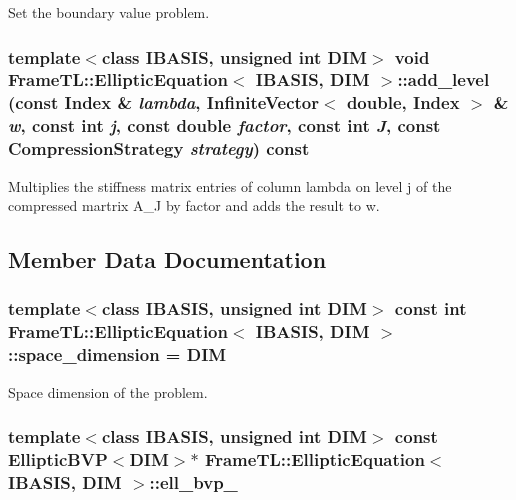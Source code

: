 Set the boundary value problem. \hypertarget{classFrameTL_1_1EllipticEquation_79b1544139e7bb5672f1af5c84a238bc}{
\subsubsection[add\_\-level]{\setlength{\rightskip}{0pt plus 5cm}template$<$class IBASIS, unsigned int DIM$>$ void {\bf FrameTL::EllipticEquation}$<$ IBASIS, DIM $>$::add\_\-level (const {\bf Index} \& {\em lambda}, \/  InfiniteVector$<$ double, {\bf Index} $>$ \& {\em w}, \/  const int {\em j}, \/  const double {\em factor}, \/  const int {\em J}, \/  const CompressionStrategy {\em strategy}) const}}
\label{classFrameTL_1_1EllipticEquation_79b1544139e7bb5672f1af5c84a238bc}


Multiplies the stiffness matrix entries of column lambda on level j of the compressed martrix A\_\-J by factor and adds the result to w. 

\subsection{Member Data Documentation}
\hypertarget{classFrameTL_1_1EllipticEquation_db618d3531a93bc69d8181064705e6a9}{
\subsubsection[space\_\-dimension]{\setlength{\rightskip}{0pt plus 5cm}template$<$class IBASIS, unsigned int DIM$>$ const int {\bf FrameTL::EllipticEquation}$<$ IBASIS, DIM $>$::{\bf space\_\-dimension} = DIM}}
\label{classFrameTL_1_1EllipticEquation_db618d3531a93bc69d8181064705e6a9}


Space dimension of the problem. \hypertarget{classFrameTL_1_1EllipticEquation_998a091c1b338f3af2ca837a5f92cdc6}{
\subsubsection[ell\_\-bvp\_\-]{\setlength{\rightskip}{0pt plus 5cm}template$<$class IBASIS, unsigned int DIM$>$ const EllipticBVP$<$DIM$>$$\ast$ {\bf FrameTL::EllipticEquation}$<$ IBASIS, DIM $>$::{\bf ell\_\-bvp\_\-}}}
\label{classFrameTL_1_1EllipticEquation_998a091c1b338f3af2ca837a5f92cdc6}


